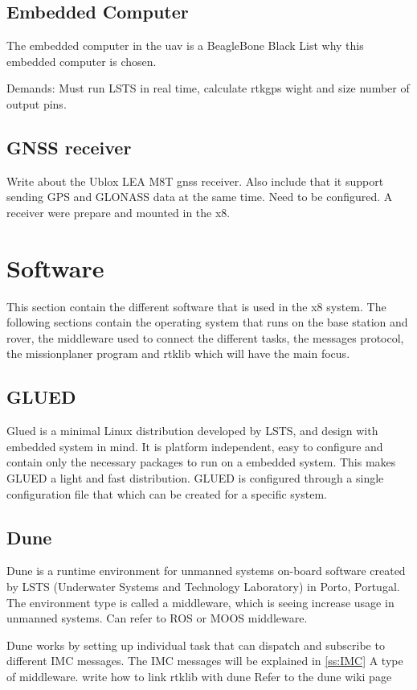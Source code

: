 \subsection{Embedded Computer}
The embedded computer in the \gls{uav} is a BeagleBone Black
List why this embedded computer is chosen. 

Demands: Must run LSTS in real time, calculate rtkgps wight and size number of output pins.
\subsection{GNSS receiver}
Write about the Ublox LEA M8T gnss receiver. Also include that it support sending GPS and GLONASS data at the same time. Need to be configured. A receiver were prepare and mounted in the x8.

\section{Software}
This section contain the different software that is used in the x8 system. The following sections contain the operating system that runs on the base station and rover, the middleware used to connect the different tasks, the messages protocol, the missionplaner program and rtklib which will have the main focus.\subsection{GLUED}
Glued is a minimal Linux distribution developed by LSTS, and design with embedded system in mind. It is platform independent, easy to configure and contain only the necessary packages to run on a embedded system. This makes GLUED a light and fast distribution. GLUED is configured through a single configuration file that which can be created for a specific system. 
\subsection{Dune}
Dune is a runtime environment for unmanned systems on-board software created by LSTS (Underwater Systems and Technology Laboratory) in Porto, Portugal. The environment type is called a middleware, which is seeing increase usage in unmanned systems. Can refer to ROS or MOOS middleware.

Dune works by setting up individual task that can dispatch and subscribe to different IMC messages. The IMC messages will be explained in \ref{ss:IMC}
A type of middleware. write how to link rtklib with dune
Refer to the dune wiki page
